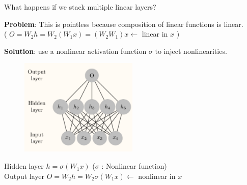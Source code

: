\begin{concept}
    What happens if we stack multiple linear layers?

    \textbf{Problem}: This is pointless because composition of linear functions is linear.\\
    ( $O = W_2 h = W_2(W_1 x) = (W_2 W_1) x \leftarrow$ linear in $x$ )

    \textbf{Solution}: use a nonlinear activation function $\sigma$ to inject nonlinearities.

    \begin{figure}[H]
        \centering
        \includegraphics[width=0.5\textwidth]{.././assets/4.2.png}
    \end{figure}

    Hidden layer $h=\sigma(W_1 x)$ ($\sigma$ : Nonlinear function)\\
    Output layer $O=W_2 h = W_2 \sigma(W_1 x) \leftarrow$ nonlinear in $x$
\end{concept}

